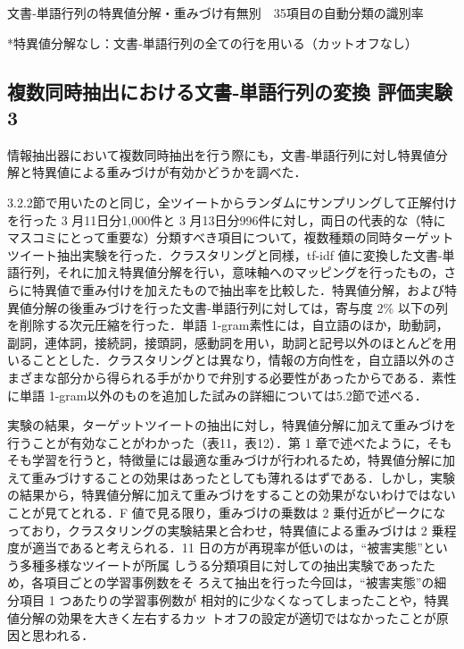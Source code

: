 \documentclass[japanese]{jnlp_1.4}
\begin{document}
\begin{table}[b]
\caption{文書‐単語行列の特異値分解・重みづけ有無別　35項目の自動分類の識別率}

\vspace{0.5zw}\small
*特異値分解なし：文書‐単語行列の全ての行を用いる（カットオフなし）\par
\end{table}


\subsection{複数同時抽出における文書‐単語行列の変換 評価実験 3}

情報抽出器において複数同時抽出を行う際にも，文書‐単語行列に対し特異値分解と特異値による重みづけが有効かどうかを調べた．

3.2.2節で用いたのと同じ，全ツイートからランダムにサンプリングして正解付けを行った 3 月11日分1,000件と 3 月13日分996件に対し，両日の代表的な（特にマスコミにとって重要な）分類すべき項目について，複数種類の同時ターゲットツイート抽出実験を行った．クラスタリングと同様，tf-idf 値に変換した文書‐単語行列，それに加え特異値分解を行い，意味軸へのマッピングを行ったもの，さらに特異値で重み付けを加えたもので抽出率を比較した．特異値分解，および特異値分解の後重みづけを行った文書‐単語行列に対しては，寄与度 2\% 以下の列を削除する次元圧縮を行った．単語 1-gram素性には，自立語のほか，助動詞，副詞，連体詞，接続詞，接頭詞，感動詞を用い，助詞と記号以外のほとんどを用いることとした．クラスタリングとは異なり，情報の方向性を，自立語以外のさまざまな部分から得られる手がかりで弁別する必要性があったからである．素性に単語 1-gram以外のものを追加した試みの詳細については5.2節で述べる．

実験の結果，ターゲットツイートの抽出に対し，特異値分解に加えて重みづけを行うことが有効なことがわかった（表11，表12）．第 1 章で述べたように，そもそも学習を行うと，特徴量には最適な重みづけが行われるため，特異値分解に加えて重みづけすることの効果はあったとしても薄れるはずである．しかし，実験の結果から，特異値分解に加えて重みづけをすることの効果がないわけではないことが見てとれる．F 値で見る限り，重みづけの乗数は 2 乗付近がピークになっており，クラスタリングの実験結果と合わせ，特異値による重みづけは 2 乗程度が適当であると考えられる．11 日の方が再現率が低いのは，“被害実態”という多種多様なツイートが所属
しうる分類項目に対しての抽出実験であったため，各項目ごとの学習事例数をそ
ろえて抽出を行った今回は，“被害実態”の細分項目 1 つあたりの学習事例数が
相対的に少なくなってしまったことや，特異値分解の効果を大きく左右するカッ
トオフの設定が適切ではなかったことが原因と思われる．
\end{document}
